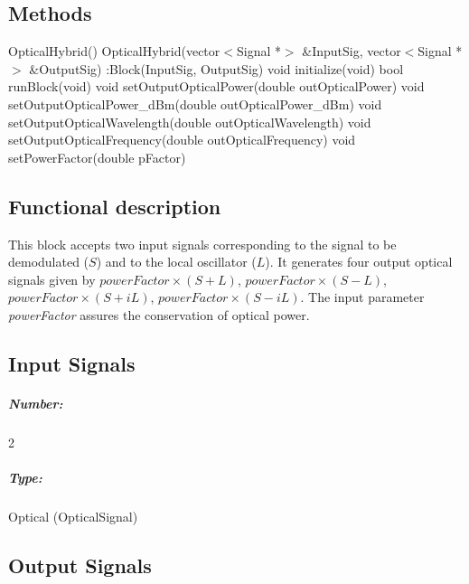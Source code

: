 
\subsection*{Methods}
 
OpticalHybrid() {}
\bigbreak
OpticalHybrid(vector$<$Signal *$>$ \&InputSig, vector$<$Signal *$>$ \&OutputSig) :Block(InputSig, OutputSig) {}
\bigbreak
void initialize(void)
\bigbreak
bool runBlock(void)
\bigbreak
void setOutputOpticalPower(double outOpticalPower)
\bigbreak
void setOutputOpticalPower\_dBm(double outOpticalPower\_dBm)
\bigbreak
void setOutputOpticalWavelength(double outOpticalWavelength)
\bigbreak
void setOutputOpticalFrequency(double outOpticalFrequency) 
\bigbreak
void setPowerFactor(double pFactor)

\subsection*{Functional description}

This block accepts two  input signals corresponding to the signal to be demodulated ($S$) and to the local oscillator ($L$). It generates four output optical signals given by $\textit{powerFactor}\times(S+L)$, $\textit{powerFactor}\times(S-L)$,$\textit{powerFactor}\times(S+iL)$, $\textit{powerFactor}\times(S-iL)$. The input parameter \textit{powerFactor} assures the conservation of optical power.

\pagebreak

\subsection*{Input Signals}

\subparagraph*{Number:} 2

\subparagraph*{Type:} Optical (OpticalSignal)

\subsection*{Output Signals}

